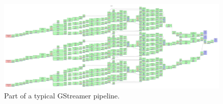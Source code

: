 \documentclass[portrait,plainboxedsections]{sciposter}
\begin{document}
\begin{minipage}[t]{0.25\textwidth}
\begin{figure}
\includegraphics[width=\textwidth]{figures/network}
\caption{\label{fig:gstreamer}Part of a typical GStreamer pipeline.}
\end{figure}

\end{minipage}
\end{document}
